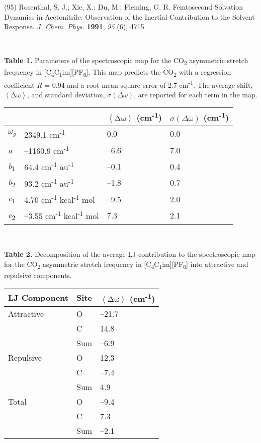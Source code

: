 \documentclass[]{article}
\begin{document}
(95) Rosenthal, S. J.; Xie, X.; Du, M.; Fleming, G. R. Femtosecond
Solvation Dynamics in Acetonitrile: Observation of the Inertial
Contribution to the Solvent Response. \emph{J. Chem. Phys.}
\textbf{1991}, \emph{95} (6), 4715.

\textbf{\\
}

\textbf{Table 1.} Parameters of the spectroscopic map for the CO\textsubscript{2} asymmetric stretch frequency in {[}C\textsubscript{4}C\textsubscript{1}im{]}{[}PF\textsubscript{6}{]}.  This map predicts the CO\textsubscript{2} with a regression coefficient \emph{R} = 0.94 and a root mean square error of 2.7 cm\textsuperscript{-1}. The average shift, \(\left\langle \text{Δω} \right\rangle\), and standard deviation, \(\sigma(\Delta\omega)\), are reported for each term in the map.

\begin{longtable}[]{@{}llll@{}}
\toprule
& & \(\left\langle \text{Δω} \right\rangle\) (cm\textsuperscript{-1}) &
\(\sigma(\Delta\omega)\) (cm\textsuperscript{-1})\tabularnewline
\midrule
\endhead
\(\omega_{g}\) & 2349.1 cm\textsuperscript{-1} & 0.0 &
0.0\tabularnewline
\emph{a} & --1160.9 cm\textsuperscript{-1} & --6.6 & 7.0\tabularnewline
\emph{b}\textsubscript{1} & 64.4 cm\textsuperscript{-1}
au\textsuperscript{-1} & --0.1 & 0.4\tabularnewline
\emph{b}\textsubscript{2} & 93.2 cm\textsuperscript{-1}
au\textsuperscript{-1} & --1.8 & 0.7\tabularnewline
\emph{c}\textsubscript{1} & 4.70 cm\textsuperscript{-1}
kcal\textsuperscript{-1} mol & --9.5 & 2.0\tabularnewline
\emph{c}\textsubscript{2} & --3.55 cm\textsuperscript{-1}
kcal\textsuperscript{-1} mol & 7.3 & 2.1\tabularnewline
\bottomrule
\end{longtable}

\textbf{\\
}

\textbf{Table 2.} Decomposition of the average LJ contribution to the spectroscopic map for the CO\textsubscript{2} asymmetric stretch frequency in {[}C\textsubscript{4}C\textsubscript{1}im{]}{[}PF\textsubscript{6}{]} into attractive and repulsive components.

\begin{longtable}[]{@{}lll@{}}
\toprule
LJ Component & Site & \(\left\langle \text{Δω} \right\rangle\)
(cm\textsuperscript{-1})\tabularnewline
\midrule
\endhead
Attractive & O & --21.7\tabularnewline
& C & 14.8\tabularnewline
& Sum & --6.9\tabularnewline
Repulsive & O & 12.3\tabularnewline
& C & --7.4\tabularnewline
& Sum & 4.9\tabularnewline
Total & O & --9.4\tabularnewline
& C & 7.3\tabularnewline
& Sum & --2.1\tabularnewline
\bottomrule
\end{longtable}
\end{document}
